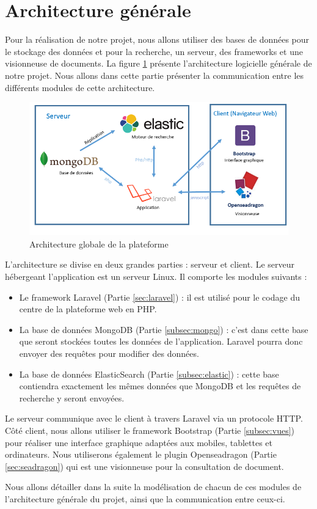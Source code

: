 \newpage
\section{Architecture générale}
\label{sec:generale}

Pour la réalisation de notre projet, nous allons utiliser des bases de données pour le stockage des données et pour la recherche, un serveur, des frameworks et une visionneuse de documents. La figure \ref{archi} présente l'architecture logicielle générale de notre projet. Nous allons dans cette partie présenter la communication entre les différents modules de cette architecture.
    \begin{figure}[H]
        \centering
        \includegraphics[width=\textwidth]{figure/Archi.png}
            \caption{Architecture globale de la plateforme}
            \label{archi}
    \end{figure}

L'architecture se divise en deux grandes parties : serveur et client. 
Le serveur hébergeant l'application est un serveur Linux. Il comporte les modules suivants :
\begin{itemize}
	\item Le framework Laravel (Partie \ref{sec:laravel}) : il est utilisé pour le codage du centre de la plateforme web en PHP.
	\item La base de données MongoDB (Partie \ref{subsec:mongo}) : c'est dans cette base que seront stockées toutes les données de l'application. Laravel pourra donc envoyer des requêtes pour modifier des données.
	\item La base de données ElasticSearch (Partie \ref{subsec:elastic}) : cette base contiendra exactement les mêmes données que MongoDB et les requêtes de recherche y seront envoyées.
\end{itemize}

Le serveur communique avec le client à travers Laravel via un protocole HTTP. Côté client, nous allons utiliser le framework Bootstrap (Partie \ref{subsec:vues}) pour réaliser une interface graphique adaptées aux mobiles, tablettes et ordinateurs. Nous utiliserons également le plugin Openseadragon (Partie \ref{sec:seadragon}) qui est une visionneuse pour la consultation de document. 

Nous allons détailler dans la suite la modélisation de chacun de ces modules de l'architecture générale du projet, ainsi que la communication entre ceux-ci.
